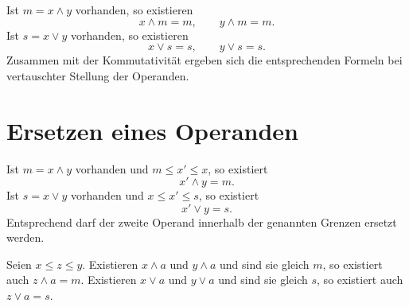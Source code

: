 \begin{theorem}
\label{b14guide:thm:repeated}
Ist $m=x\wedge y$ vorhanden, so existieren
\[
 x\wedge m=m,\qquad y\wedge m=m.
\]
Ist $s=x\vee y$ vorhanden, so existieren
\[
 x\vee s=s,\qquad y\vee s=s.
\]
Zusammen mit der Kommutativität ergeben sich die entsprechenden
Formeln bei vertauschter Stellung der Operanden.
\end{theorem}

\section{Ersetzen eines Operanden}

\begin{theorem}
\label{b14guide:thm:replacement}
Ist $m=x\wedge y$ vorhanden und $m\leq x'\leq x$, so existiert
\[
 x'\wedge y=m.
\]
Ist $s=x\vee y$ vorhanden und $x\leq x'\leq s$, so existiert
\[
 x'\vee y=s.
\]
Entsprechend darf der zweite Operand innerhalb der genannten
Grenzen ersetzt werden.
\end{theorem}

\begin{theorem}
\label{b14guide:thm:plateau}
Seien $x\leq z\leq y$. Existieren $x\wedge a$ und $y\wedge a$
und sind sie gleich $m$, so existiert auch $z\wedge a=m$.
Existieren $x\vee a$ und $y\vee a$ und sind sie gleich $s$,
so existiert auch $z\vee a=s$.
\end{theorem}